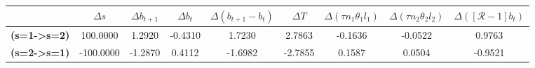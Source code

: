 \begin{tiny}\begin{tabular}{|l|c|c|c|c|c|c|c|c|}
\hline
&\textbf{$\Delta s$}&\textbf{$\Delta b_{t+1}$}&\textbf{$\Delta b_{t}$}&\textbf{$\Delta (b_{t+1}-b_{t})$}&\textbf{$\Delta T$}&\textbf{$\Delta (\tau n_1\theta_1 l_1 )$}&\textbf{$\Delta (\tau n_2\theta_2 l_2)$}&\textbf{$\Delta ([\mathcal{R}-1]b_t)$}\\\hline
\textbf{(s=1->s=2)}&100.0000&1.2920&-0.4310&1.7230&2.7863&-0.1636&-0.0522&0.9763\\\hline
\textbf{ (s=2->s=1)}&-100.0000&-1.2870&0.4112&-1.6982&-2.7855&0.1587&0.0504&-0.9521\\\hline
\end{tabular}
\end{tiny}